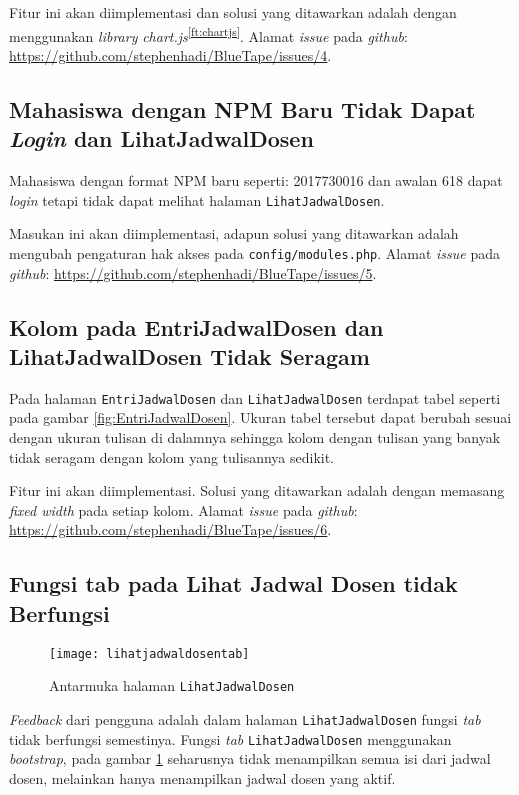 Fitur ini akan diimplementasi dan solusi yang ditawarkan adalah dengan menggunakan \textit{library} \textit{chart.js}\textsuperscript{\ref{ft:chartjs}}. Alamat \textit{issue} pada \textit{github}: \url{https://github.com/stephenhadi/BlueTape/issues/4}.

\subsection{Mahasiswa dengan NPM Baru Tidak Dapat \textit{Login} dan LihatJadwalDosen}
\label{issue:5}
Mahasiswa dengan format NPM baru seperti: 2017730016 dan awalan 618 dapat \textit{login} tetapi tidak dapat melihat halaman \texttt{LihatJadwalDosen}. 

Masukan ini akan diimplementasi, adapun solusi yang ditawarkan adalah mengubah {peng\-a\-turan} hak akses pada \texttt{config/modules.php}. Alamat \textit{issue} pada \textit{github}: \url{https://github.com/stephenhadi/BlueTape/issues/5}. 

\subsection{Kolom pada EntriJadwalDosen dan LihatJadwalDosen Tidak Seragam}
\label{issue:6} 
Pada halaman \texttt{EntriJadwalDosen} dan \texttt{LihatJadwalDosen} terdapat tabel seperti pada gambar \ref{fig:EntriJadwalDosen}. Ukuran tabel tersebut dapat berubah sesuai dengan ukuran tulisan di dalamnya sehingga kolom dengan tulisan yang banyak tidak seragam dengan kolom yang tulisannya sedikit.

Fitur ini akan diimplementasi. Solusi yang ditawarkan adalah dengan memasang \textit{fixed width} pada setiap kolom. Alamat \textit{issue} pada \textit{github}: \url{https://github.com/stephenhadi/BlueTape/issues/6}. 

\subsection{Fungsi tab pada Lihat Jadwal Dosen tidak Berfungsi}
\label{issue:7}

\begin{figure}[H]
	\centering
	\texttt{[image: lihatjadwaldosentab]} 
	\caption{Antarmuka halaman \texttt{LihatJadwalDosen}}
	\label{fig:tablihatjadwaldosen} 
\end{figure}

\textit{Feedback} dari pengguna adalah dalam halaman \texttt{LihatJadwalDosen} fungsi \textit{tab} tidak berfungsi semestinya. Fungsi \textit{tab} \texttt{LihatJadwalDosen} menggunakan \textit{bootstrap}, pada gambar \ref{fig:tablihatjadwaldosen} seharusnya tidak menampilkan semua isi dari jadwal dosen, melainkan hanya menampilkan jadwal dosen yang aktif.

